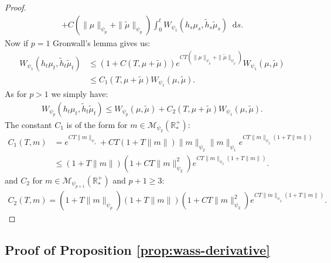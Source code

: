 \documentclass[11pt,a4paper]{article}
\newcommand{\RRP}{\mathbb{R}^+_*}
\newcommand{\MC}{\mathcal{M}}
\newcommand{\dd}{\mathop{}\!\mathrm{d}}
\begin{document}
\begin{proof}
\begin{multline*}
         + C\left(\|\mu\|_{\psi_{p}}+ \|\tilde{\mu}\|_{\psi_{p}} \right)\int_0^t W_{\psi_1}(h_s\mu_s, \tilde{h}_s \tilde{\mu}_s) \dd s.
    \end{multline*}
    Now if $p = 1$ Gronwall's lemma gives us:
    \begin{align*}
        W_{\psi_1} \left(h_t\mu_t ,\tilde{h}_t\tilde{\mu}_t\right) &\leq  (1 + C(T,\mu + \tilde{\mu}))e^{CT\left(\|\mu\|_{\psi_{p}}+ \|\tilde{\mu}\|_{\psi_{p}} \right)}W_{\psi_1}(\mu,\tilde{\mu}) \\
        &\leq C_1(T,\mu + \tilde{\mu})W_{\psi_1}(\mu,\tilde{\mu}).
    \end{align*}
    As for $p > 1$ we simply have:
    \begin{align*}
        W_{\psi_p} \left(h_t\mu_t ,\tilde{h}_t\tilde{\mu}_t\right) \leq W_{\psi_p}(\mu,\tilde{\mu}) + C_2(T,\mu + \tilde{\mu})W_{\psi_1}(\mu,\tilde{\mu}).
    \end{align*}
    The constant $C_1$ is of the form for $m \in \MC_{\psi_2}(\RRP)$:
    \begin{align*}
        C_1(T,m) &= e^{CT\|m\|_{\psi_{1}}} + CT\left( 1 + T\|m\|\right)\|m\|_{\psi_2}\|m\|_{\psi_{1}}e^{CT\|m\|_{\psi_2}\left(1 + T\|m\|\right)} \\
        & \leq \left( 1 + T\|m\|\right)\left(1 +  CT\|m\|_{\psi_2}^2\right) e^{CT\|m\|_{\psi_2}\left(1 + T\|m\|\right)}.
    \end{align*}
    and $C_2$ for $m \in \MC_{\psi_{p+1}}(\RRP)$ and $p+1 \geq 3$:
    \begin{align*}
        C_2(T,m) = ( 1  + T\|m\|_{\psi_{p}})\left( 1 + T\|m\|\right)\left(1 +  CT\|m\|_{\psi_2}^2\right) e^{CT\|m\|_{\psi_2}\left(1 + T\|m\|\right)}.
    \end{align*}
\end{proof}
\subsection{Proof of Proposition \ref{prop:wass-derivative}}
\end{document}
